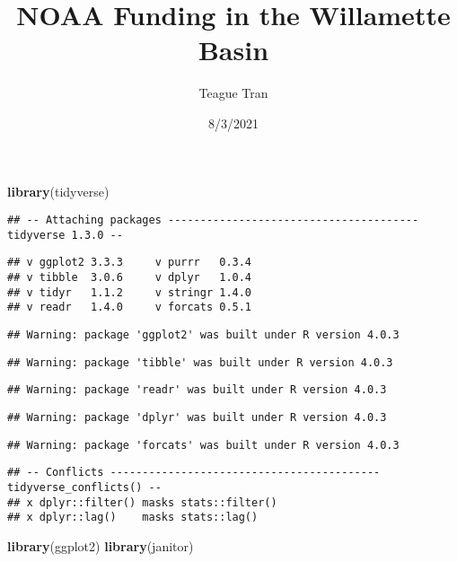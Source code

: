 \documentclass[
]{article}
\title{NOAA Funding in the Willamette Basin}
\author{Teague Tran}
\date{8/3/2021}
\newenvironment{Shaded}{\begin{snugshade}}{\end{snugshade}}
\newcommand{\KeywordTok}[1]{\textcolor[rgb]{0.13,0.29,0.53}{\textbf{#1}}}
\newcommand{\NormalTok}[1]{#1}
\begin{document}
\maketitle

\begin{Shaded}
\begin{Highlighting}[]
\KeywordTok{library}\NormalTok{(tidyverse)}
\end{Highlighting}
\end{Shaded}

\begin{verbatim}
## -- Attaching packages --------------------------------------- tidyverse 1.3.0 --
\end{verbatim}

\begin{verbatim}
## v ggplot2 3.3.3     v purrr   0.3.4
## v tibble  3.0.6     v dplyr   1.0.4
## v tidyr   1.1.2     v stringr 1.4.0
## v readr   1.4.0     v forcats 0.5.1
\end{verbatim}

\begin{verbatim}
## Warning: package 'ggplot2' was built under R version 4.0.3
\end{verbatim}

\begin{verbatim}
## Warning: package 'tibble' was built under R version 4.0.3
\end{verbatim}

\begin{verbatim}
## Warning: package 'readr' was built under R version 4.0.3
\end{verbatim}

\begin{verbatim}
## Warning: package 'dplyr' was built under R version 4.0.3
\end{verbatim}

\begin{verbatim}
## Warning: package 'forcats' was built under R version 4.0.3
\end{verbatim}

\begin{verbatim}
## -- Conflicts ------------------------------------------ tidyverse_conflicts() --
## x dplyr::filter() masks stats::filter()
## x dplyr::lag()    masks stats::lag()
\end{verbatim}

\begin{Shaded}
\begin{Highlighting}[]
\KeywordTok{library}\NormalTok{(ggplot2)}
\KeywordTok{library}\NormalTok{(janitor)}
\end{Highlighting}
\end{Shaded}
\end{document}
